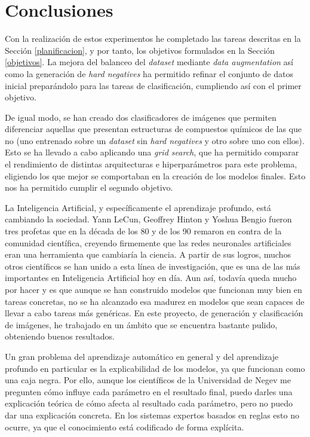 \chapter{Conclusiones}
Con la realización de estos experimentos he completado las tareas descritas en la Sección \ref{planificacion}, y por tanto, los objetivos formulados en la Sección \ref{objetivos}. La mejora del balanceo del \textit{dataset} mediante \textit{data augmentation} así como la generación de \textit{hard negatives} ha permitido refinar el conjunto de datos inicial preparándolo para las tareas de clasificación, cumpliendo así con el primer objetivo. 

De igual modo, se han creado dos clasificadores de imágenes que permiten diferenciar aquellas que presentan estructuras de compuestos químicos de las que no (uno entrenado sobre un \textit{dataset} sin \textit{hard negatives} y otro sobre uno con ellos). Esto se ha llevado a cabo aplicando una \textit{grid search}, que ha permitido comparar el rendimiento de distintas arquitecturas e hiperparámetros para este problema, eligiendo los que mejor se comportaban en la creación de los modelos finales. Esto nos ha permitido cumplir el segundo objetivo.

La Inteligencia Artificial, y específicamente el aprendizaje profundo, está cambiando la sociedad. Yann LeCun, Geoffrey Hinton y Yoshua Bengio fueron tres profetas que en la década de los 80 y de los 90 remaron en contra de la comunidad científica, creyendo firmemente que las redes neuronales artificiales eran una herramienta que cambiaría la ciencia. A partir de sus logros, muchos otros científicos se han unido a esta línea de investigación, que es una de las más importantes en Inteligencia Artificial hoy en día. Aun así, todavía queda mucho por hacer y es que aunque se han construido modelos que funcionan muy bien en tareas concretas, no se ha alcanzado esa madurez en modelos que sean capaces de llevar a cabo tareas más genéricas. En este proyecto, de generación y clasificación de imágenes, he trabajado en un ámbito que se encuentra bastante pulido, obteniendo buenos resultados.

Un gran problema del aprendizaje automático en general y del aprendizaje profundo en particular es la explicabilidad de los modelos, ya que funcionan como una caja negra. Por ello, aunque los científicos de la Universidad de Negev me pregunten cómo influye cada parámetro en el resultado final, puedo darles una explicación teórica de cómo afecta al resultado cada parámetro, pero no puedo dar una explicación concreta. En los sistemas expertos basados en reglas esto no ocurre, ya que el conocimiento está codificado de forma explícita. 

